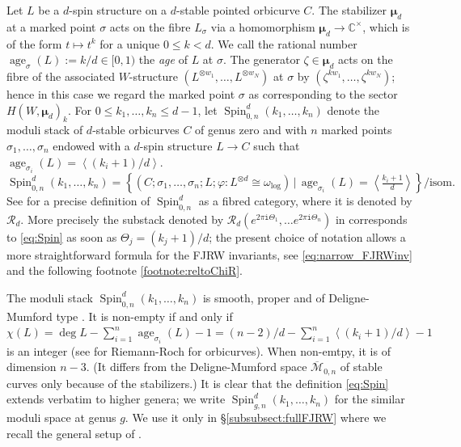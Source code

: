 \documentclass[11pt]{amsart}
\theoremstyle{definition} %
\theoremstyle{remark} %
\newcommand{\CC}{\mathbb C}
\newcommand{\age}{\operatorname{age}}
\def\fracp#1{\left\langle #1 \right\rangle}
\newcommand{\bmu}{\boldsymbol{\mu}}
\newcommand{\cM}{\mathcal{M}}
\newcommand{\cR}{\mathcal{R}}
\newcommand{\Spin}{\operatorname{Spin}}
\newcommand{\ov}{\overline}
\newcommand{\iu}{\mathtt{i}}
\begin{document}
Let $L$ be a $d$-spin structure on a $d$-stable 
pointed orbicurve $C$. 
The stabilizer $\bmu_d$ at a marked point $\sigma$ 
acts on the fibre $L_\sigma$ via a homomorphism $\bmu_d \to \CC^\times$, 
which is of the form $t\mapsto t^k$ for a unique 
$0\le k<d$. 
We call the rational number $\age_\sigma(L) := k/d 
\in [0,1)$ the \emph{age} of $L$ at $\sigma$. 
The generator $\zeta\in \bmu_d$ acts on 
the fibre of the associated $W$-structure 
$(L^{\otimes w_1},\dots,L^{\otimes w_N})$ at $\sigma$ 
by $(\zeta^{kw_1},\dots,\zeta^{k w_N})$; 
hence in this case we regard the marked point $\sigma$ 
as corresponding to the sector $H(W,\bmu_d)_k$. 
For $0\le k_1,\dots,k_n\le d-1$, 
let $\Spin^d_{0,n}(k_1,\dots,k_n)$ denote the moduli stack of 
$d$-stable orbicurves $C$ of genus zero and 
with $n$ marked points $\sigma_1,\dots,\sigma_n$ 
endowed with a $d$-spin structure $L\to C$ 
such that $\age_{\sigma_i}(L) = \fracp{(k_i+1)/d}$. 
\begin{equation}
\label{eq:Spin}
\Spin^d_{0,n} (k_1,\dots,k_n) = 
\left\{\left(C;\sigma_1,\dots,\sigma_n; L;
\varphi \colon L^{\otimes d}
\cong \omega_{\log}\right) \, \Big|\, 
\age_{\sigma_i}(L) =\fracp{\tfrac{k_i+1}{d}} \right\}\Big/ 
\text{isom}.  
\end{equation} 
See \cite[Appendix]{ChiRquintic} for a precise 
definition of $\Spin^d_{0,n}$ as a fibred category, 
where it is denoted by $\cR_d$.  
More precisely the substack denoted by
$\cR_d(e^{2\pi \iu \Theta_1},\dots e^{2\pi \iu \Theta_n})$
in \cite{ChiRquintic}
corresponds to \eqref{eq:Spin} as soon as $\Theta_j=(k_j+1)/d$;
the present choice of notation allows a more straightforward
formula for the  FJRW invariants, see
\eqref{eq:narrow_FJRWinv} and the following footnote
\ref{footnote:reltoChiR}. 

The moduli stack $\Spin^d_{0,n}(k_1,\dots,k_n)$ 
is smooth, proper and of Deligne-Mumford type \cite{Chistab}. 
It is non-empty if and only if 
$\chi(L) = \deg L - \sum_{i=1}^n \age_{\sigma_i}(L) -1 = 
(n-2)/d - \sum_{i=1}^n \fracp{(k_i+1)/d}-1$
is an integer (see \cite{AGV,Kawasaki,Toen} for Riemann-Roch for orbicurves). 
When non-emtpy, it is of dimension $n-3$. 
(It differs from the Deligne-Mumford space $\ov{\cM}_{0,n}$ 
of stable curves only because of the stabilizers.) 
It is clear that the definition \eqref{eq:Spin} extends
{verbatim} to higher genera; we write
$\Spin^d_{g,n}(k_1,\dots,k_n)$ for the similar moduli 
space at genus $g$. 
We use it only in \S\ref{subsubsect:fullFJRW} 
where we recall the general setup of \cite{FJR1}.
\end{document}
